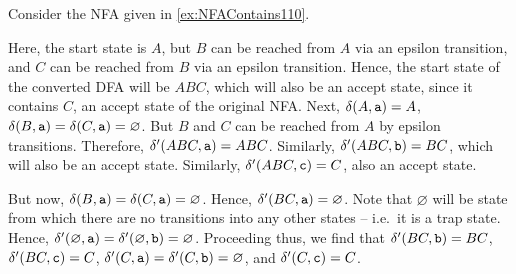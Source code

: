 \begin{Example}
Consider the NFA given in \cref{ex:NFAContains110}.
\begin{center}
\end{center}
Here, the start state is $A$, but $B$ can be reached from $A$ via an epsilon transition, and $C$ can be reached from $B$ via an epsilon transition. Hence, the start state of the converted DFA will be $ABC$, which will also be an accept state, since it contains $C$, an accept state of the original NFA. Next, $\delta(A, \ta) = A$, $\delta(B, \ta) = \delta(C, \ta) = \varnothing$. But $B$ and $C$ can be reached from $A$ by epsilon transitions. Therefore, $\delta'(ABC, \ta) = ABC$. Similarly, $\delta'(ABC, \tb) = BC$, which will also be an accept state. Similarly, $\delta'(ABC, \tc) = C$, also an accept state.
\begin{center}
\end{center}
But now, $\delta(B, \ta) = \delta(C, \ta) = \varnothing$. Hence, $\delta'(BC, \ta) = \varnothing$. Note that $\varnothing$ will be state from which there are no transitions into any other states -- i.e.\ it is a trap state. Hence, $\delta'(\varnothing, \ta) = \delta'(\varnothing, \tb) = \varnothing$. Proceeding thus, we find that $\delta'(BC, \tb) = BC$, $\delta'(BC, \tc) = C$, $\delta'(C, \ta) = \delta'(C, \tb) = \varnothing$, and $\delta'(C, \tc) = C$.
\begin{center}
\begin{tikzpicture}[> = stealth, shorten > = 1pt, node distance = 2cm, on grid, auto, initial text =]

\end{tikzpicture}
\end{center}
\end{Example}
